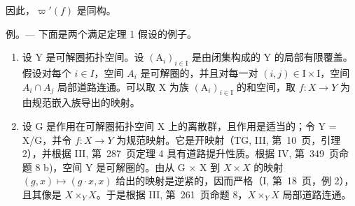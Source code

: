 因此，\(\varpi'(f)\) 是同构。

例。--- 下面是两个满足定理 1 假设的例子。

\begin{enumerate}
\def\labelenumi{\arabic{enumi})}
\item
  设 Y 是可解圈拓扑空间。设 \((\mathrm{A}_{i})_{i\in\mathrm{I}}\) 是由闭集构成的 Y 的局部有限覆盖。假设对每个 \(i\in I\)，空间 \(A_{i}\) 是可解圈的，并且对每一对 \((i,j)\in\mathrm{I}\times\mathrm{I}\)，空间 \(A_{i}\cap A_{j}\) 局部道路连通。可以取 X 为族 \((\mathrm{A}_{i})_{i\in\mathrm{I}}\) 的和空间，取 \(f:X\to Y\) 为由规范嵌入族导出的映射。
\item
  设 G 是作用在可解圈拓扑空间 X 上的离散群，且作用是适当的；令 Y = X/G，并令 \(f: X \to Y\) 为规范映射。它是开映射（TG, III, 第~10~页，引理 2），并根据 III, 第~287~页定理 4 具有道路提升性质。根据 IV, 第~349~页命题 8 b)，空间 Y 是可解圈的。由从 G × X 到 \(X\times X\) 的映射 \((g, x) \mapsto (g \cdot x, x)\) 给出的映射是逆紧的，因而严格（I, 第~18~页，例 2），且其像是 \(X\times_{Y}X\)。于是根据 III, 第~261~页命题 8，\(X\times_{Y}X\) 局部道路连通。
\end{enumerate}

